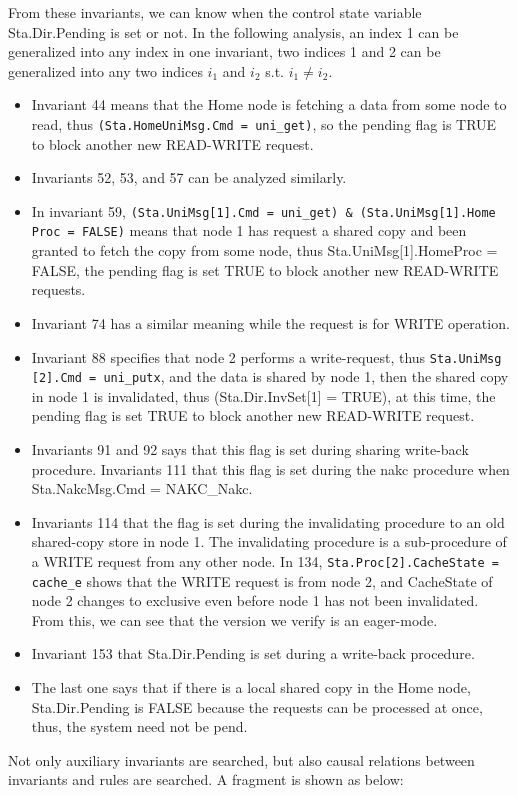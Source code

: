 \documentclass{llncs}
\begin{document}
From these invariants, we can know when the control state variable Sta.Dir.Pending is set or not. In the following analysis, an index 1 can be generalized into any index in one invariant,  two indices 1 and 2 can be generalized into any two indices $i_1$ and $i_2$ s.t. $i_1 \neq i_2$.
\begin{itemize}
 \item Invariant 44 means that the Home node is fetching a data from some node to read, thus {\tt (Sta.HomeUniMsg.Cmd = uni\_get)}, so the pending flag is  TRUE to block another new READ-WRITE request.
 \item Invariants 52, 53, and 57 can be analyzed similarly.
 \item In invariant 59, {\tt (Sta.UniMsg[1].Cmd = uni\_get) \& (Sta.UniMsg[1].Home} {\tt Proc = FALSE)} means that node 1 has request a shared copy and been granted to fetch the copy from some node, thus Sta.UniMsg[1].HomeProc = FALSE, the pending flag is set TRUE to block another new READ-WRITE requests.
  \item    Invariant 74 has a similar meaning while the request is for WRITE operation.

  \item    Invariant 88 specifies that node 2 performs a write-request, thus {\tt Sta.UniMsg} {\tt[2].Cmd = uni\_putx}, and the data is shared by node 1, then the shared copy in node 1 is invalidated, thus (Sta.Dir.InvSet[1] = TRUE), at this time,  the pending flag is set TRUE to block another new READ-WRITE request.

  \item   Invariants 91 and 92 says that this flag is set during sharing write-back procedure. Invariants 111  that this flag is set during the nakc procedure when  Sta.NakcMsg.Cmd = NAKC\_Nakc.

   \item     Invariants 114 that the flag is set during the invalidating procedure to an old shared-copy store in node 1. The invalidating procedure is a sub-procedure  of a WRITE request from any other node. In 134, {\tt Sta.Proc[2].CacheState = cache\_e} shows that the WRITE request is from node 2, and CacheState of node 2 changes to exclusive even before node 1 has not been invalidated. From this, we can see that the version we verify is an eager-mode.

   \item       Invariant 153 that Sta.Dir.Pending is set during a write-back procedure.

  \item  The last one says that if there is a  local shared copy in the Home node, Sta.Dir.Pending is FALSE because the   requests can be processed at once, thus, the system need not be pend.
\end{itemize}
Not only auxiliary invariants are searched, but also causal relations between   invariants and  rules are searched.
A fragment is shown as below:
\end{document}
